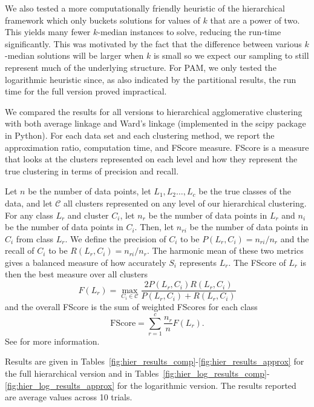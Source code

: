 \documentclass[conference, 10pt, final]{IEEEtran}
\begin{document}
We also tested a more computationally friendly heuristic of the hierarchical framework which only buckets solutions for values of $k$ that are a power of two. This yields many fewer $k$-median instances to solve, reducing the run-time significantly. This was motivated by the fact that the difference between various $k$-median solutions will be larger when $k$ is small so we expect our sampling to still represent much of the underlying structure. For PAM, we only tested the logarithmic heuristic since, as also indicated by the partitional results, the run time for the full version proved impractical. 

We compared the results for all versions to hierarchical agglomerative clustering with both average linkage and Ward's linkage (implemented in the scipy package in Python). 
For each data set and each clustering method, we report the approximation ratio, computation time, and FScore measure.  FScore is a measure that looks at the clusters represented on each level and how they represent the true clustering in terms of precision and recall. 

Let $n$ be the number of data points, let $L_1, L_2 \ldots, L_c$ be the true classes of the data, and let $\mathcal{C}$ all clusters represented on any level of our hierarchical clustering. For any class $L_r$ and cluster $C_i$, let $n_r$ be the number of data points in $L_r$ and $n_i$ be the number of data points in $C_i$. Then, let $n_{ri}$ be the number of data points in $C_i$ from class $L_r$. We define the precision of $C_i$ to be $P(L_r, C_i) = n_{ri}/n_r$ and the recall of $C_i$ to be $R(L_r, C_i) = n_{ri}/n_r$. The harmonic mean of these two metrics gives a balanced measure of how accurately $S_i$ represents $L_r$. The FScore of $L_r$ is then the best measure over all clusters
\begin{equation}
 F(L_r) = \max_{C_i \in \mathcal{C}}  \frac{ 2 P(L_r, C_i)  R(L_r, C_i)}{ P(L_r, C_i) + R(L_r, C_i)} 
\end{equation}
and the overall FScore is the sum of weighted FScores for each class
\begin{equation}
\mathrm{FScore} = \sum_{r=1}^c \frac{n_r}{n} F(L_r).
\end{equation}
See \cite{Larsen} for more information. 

Results are given in Tables~\ref{fig:hier_results_comp}-\ref{fig:hier_results_approx} for the full hierarchical version and in Tables~\ref{fig:hier_log_results_comp}-\ref{fig:hier_log_results_approx} for the logarithmic version. The results reported are average values across 10 trials.
\end{document}

